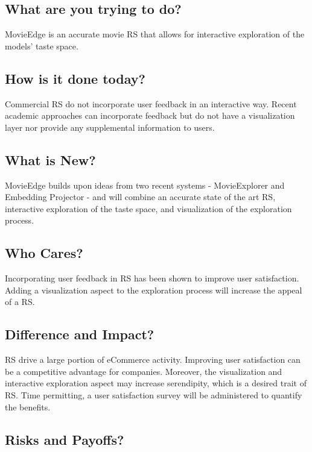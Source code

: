 \subsection{What are you trying to do?} 

MovieEdge is an accurate movie RS that allows for interactive exploration of the models’ taste space. 

\subsection{How is it done today?}

Commercial RS do not incorporate user feedback in an interactive way. Recent academic approaches can incorporate feedback but do not have a visualization layer nor provide any supplemental information to users.  

\subsection{What is New?}

MovieEdge builds upon ideas from two recent systems - MovieExplorer and Embedding Projector - and will combine an accurate state of the art RS, interactive exploration of the taste space, and visualization of the exploration process.  

\subsection{Who Cares?}

Incorporating user feedback in RS has been shown to improve user satisfaction. Adding a visualization aspect to the exploration process will increase the appeal of a RS. 

\subsection{Difference and Impact?}

RS drive a large portion of eCommerce activity. Improving user satisfaction can be a competitive advantage for companies. Moreover, the visualization and interactive exploration aspect may increase serendipity, which is a desired trait of RS. Time permitting, a user satisfaction survey will be administered to quantify the benefits. 

\subsection{Risks and Payoffs?}

